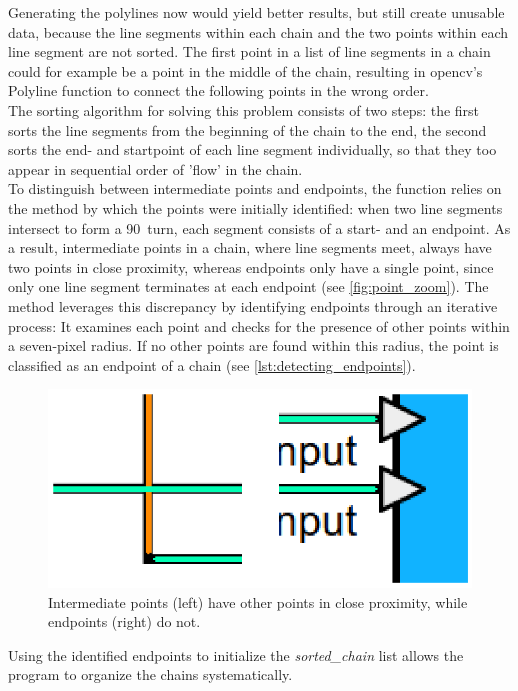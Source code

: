 Generating the polylines now would yield better results, but still create unusable data, because the line segments within each chain and the two points within each line segment are not sorted. The first point in a list of line segments in a chain could for example be a point in the middle of the chain, resulting in \acrshort{opencv}'s Polyline function to connect the following points in the wrong order.\\
The sorting algorithm for solving this problem consists of two steps: the first sorts the line segments from the beginning of the chain to the end, the second sorts the end- and startpoint of each line segment individually, so that they too appear in sequential order of 'flow' in the chain.\\
To distinguish between intermediate points and endpoints, the function relies on the method by which the points were initially identified: when two line segments intersect to form a 90\textdegree\ turn, each segment consists of a start- and an endpoint. As a result, intermediate points in a chain, where line segments meet, always have two points in close proximity, whereas endpoints only have a single point, since only one line segment terminates at each endpoint (see \autoref{fig:point_zoom}).
The method leverages this discrepancy by identifying endpoints through an iterative process: It examines each point and checks for the presence of other points within a seven-pixel radius. If no other points are found within this radius, the point is classified as an endpoint of a chain (see \autoref{lst:detecting_endpoints}).\\

\begin{figure}
    \centering
    \includegraphics[width=0.5\linewidth]{pictures/zoomed_in_points.png}
    \caption[Intermediate points / Endpoints difference]{Intermediate points (left) have other points in close proximity, while endpoints (right) do not.}
    \label{fig:point_zoom}
\end{figure}
Using the identified endpoints to initialize the \textit{sorted\_chain} list allows the program to organize the chains systematically.\\
